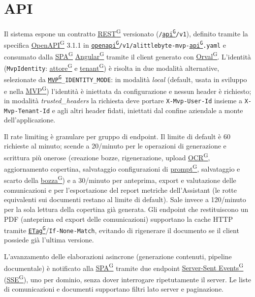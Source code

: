 \documentclass[a4paper,12pt]{article}
\providecommand{\glslink}[2]{\href{https://alittlebyte-19.github.io/Documentazione/glossario.html\#gls-#1}{\underline{#2}\textsuperscript{\scriptsize G}}}
\begin{document}
\section{API}

Il sistema espone un contratto \glslink{rest-representational-state-transfer}{REST} versionato (\texttt{/\glslink{api-application-programming-interface}{api}/v1}), definito tramite la specifica \glslink{openapi}{OpenAPI} 3.1.1 in \texttt{\glslink{openapi}{openapi}/v1/alittlebyte-mvp-\glslink{api-application-programming-interface}{api}.yaml} e consumato dalla \glslink{spa-single-page-application}{SPA} \glslink{angular}{Angular} tramite il client generato con \glslink{orval}{Orval}. L'identità (\texttt{MvpIdentity}: \glslink{attore}{attore} e \glslink{tenant}{tenant}) è risolta in due modalità alternative, selezionate da \texttt{\glslink{mvp-minimum-viable-product}{MVP}\_IDENTITY\_MODE}: in modalità \textit{local} (default, usata in sviluppo e nella \glslink{mvp-minimum-viable-product}{MVP}) l'identità è iniettata da configurazione e nessun header è richiesto; in modalità \textit{trusted\_headers} la richiesta deve portare \texttt{X-Mvp-User-Id} insieme a \texttt{X-Mvp-Tenant-Id} e agli altri header fidati, iniettati dal confine aziendale a monte dell'applicazione.

Il rate limiting è granulare per gruppo di endpoint. Il limite di default è 60 richieste al minuto; scende a 20/minuto per le operazioni di generazione e scrittura più onerose (creazione bozze, rigenerazione, upload \glslink{ocr-riconoscimento-ottico-dei-caratteri}{OCR}, aggiornamento copertina, salvataggio configurazioni di \glslink{prompt}{prompt}, salvataggio e scarto della \glslink{bozza-draft}{bozza}) e a 30/minuto per anteprima, export e valutazione delle comunicazioni e per l'esportazione del report metriche dell'Assistant (le rotte equivalenti sui documenti restano al limite di default). Sale invece a 120/minuto per la sola lettura della copertina già generata. Gli endpoint che restituiscono un PDF (anteprima ed export delle comunicazioni) supportano la cache HTTP tramite \texttt{\glslink{etag}{ETag}}/\texttt{If-None-Match}, evitando di rigenerare il documento se il client possiede già l'ultima versione.

L'avanzamento delle elaborazioni asincrone (generazione contenuti, pipeline documentale) è notificato alla \glslink{spa-single-page-application}{SPA} tramite due endpoint \glslink{sse-server-sent-events}{Server-Sent Events} (\glslink{sse-server-sent-events}{SSE}), uno per dominio, senza dover interrogare ripetutamente il server. Le liste di comunicazioni e documenti supportano filtri lato server e paginazione.
\end{document}
